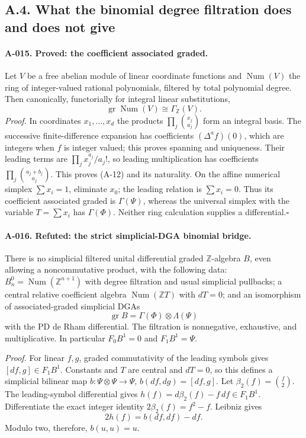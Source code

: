 \subsection{A.4. What the binomial degree filtration does and does not give}

\paragraph{A-015. Proved: the coefficient associated graded.}
Let $V$ be a free abelian module of linear coordinate functions and
$\operatorname{Num}(V)$ the ring of integer-valued rational
polynomials, filtered by total polynomial degree. Then canonically,
functorially for integral linear substitutions,
\[
 \operatorname{gr}\operatorname{Num}(V)\cong\Gamma_{\mathbb Z}(V).
 \tag{A-12}
\]
\emph{Proof.}
In coordinates $x_1,\ldots,x_d$ the products
$\prod_j\binom{x_j}{a_j}$ form an integral basis. The successive
finite-difference expansion has coefficients
$(\Delta^a f)(0)$, which are integers when $f$ is integer valued;
this proves spanning and uniqueness. Their leading terms are
$\prod_j x_j^{a_j}/a_j!$, so leading multiplication has coefficients
$\prod_j\binom{a_j+b_j}{a_j}$. This proves (A-12) and its
naturality. On the affine numerical simplex $\sum x_i=1$, eliminate
$x_0$; the leading relation is $\sum x_i=0$. Thus its coefficient
associated graded is $\Gamma(\Psi)$, whereas the universal simplex
with the variable $T=\sum x_i$ has $\Gamma(\Phi)$.
Neither ring calculation supplies a differential.\hfill$\square$

\paragraph{A-016. Refuted: the strict simplicial-DGA binomial bridge.}
There is no simplicial filtered unital differential graded
$\mathbb Z$-algebra $B$, even allowing a noncommutative product,
with the following data: $B_n^0=\operatorname{Num}(\mathbb Z^{n+1})$
with degree filtration and usual simplicial pullbacks; a central
relative coefficient algebra $\operatorname{Num}(\mathbb Z T)$
with $dT=0$; and an isomorphism of associated-graded simplicial
DGAs
\[
 \operatorname{gr}B=\Gamma(\Phi)\otimes\Lambda(\Psi)
\]
with the PD de Rham differential. The filtration is nonnegative,
exhaustive, and multiplicative. In particular $F_0B^1=0$ and
$F_1B^1=\Psi$.

\emph{Proof.}
For linear $f,g$, graded commutativity of the leading symbols gives
$[df,g]\in F_1B^1$. Constants and $T$ are central and $dT=0$,
so this defines a simplicial bilinear map
$b:\Psi\otimes\Psi\to\Psi$, $b(df,dg)=[df,g]$.
Let $\beta_2(f)=\binom f2$. The leading-symbol differential gives
$h(f)=d\beta_2(f)-f\,df\in F_1B^1$. Differentiate the exact
integer identity $2\beta_2(f)=f^2-f$. Leibniz gives
\[
 2h(f)=b(df,df)-df.
 \tag{A-13}
\]
Modulo two, therefore, $b(u,u)=u$.

